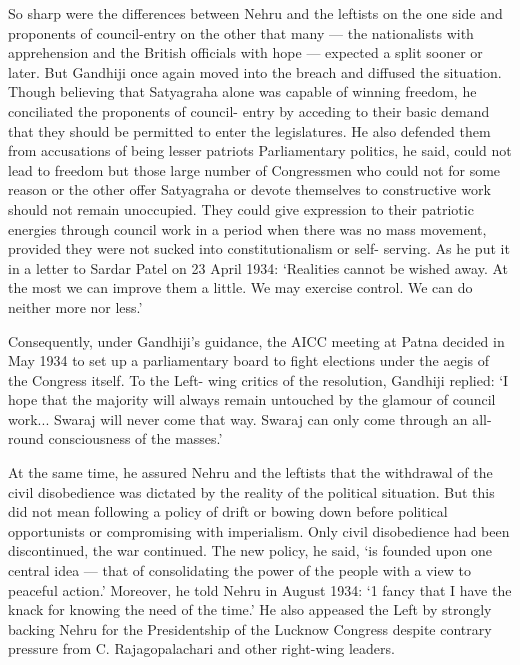 So sharp were the differences between Nehru and the leftists on the one side and proponents of council-entry on the other that many — the nationalists with apprehension and the British officials with hope — expected a split sooner or later. But Gandhiji once again moved into the breach and diffused the situation. Though believing that Satyagraha alone was capable of winning freedom, he conciliated the proponents of council- entry by acceding to their basic demand that they should be permitted to enter the legislatures. He also defended them from accusations of being lesser patriots Parliamentary politics, he said, could not lead to freedom but those large number of Congressmen who could not for some reason or the other offer Satyagraha or devote themselves to constructive work should not remain unoccupied. They could give expression to their patriotic energies through council work in a period when there was no mass movement, provided they were not sucked into constitutionalism or self- serving. As he put it in a letter to Sardar Patel on 23 April 1934: `Realities cannot be wished away. At the most we can improve them a little. We may exercise control. We can do neither more nor less.' 

Consequently, under Gandhiji's guidance, the AICC meeting at Patna decided in May 1934 to set up a parliamentary board to fight elections under the aegis of the Congress itself. To the Left- wing critics of the resolution, Gandhiji replied: `I hope that the majority will always remain untouched by the glamour of council work... Swaraj will never come that way. Swaraj can only come through an all-round consciousness of the masses.' 

At the same time, he assured Nehru and the leftists that the withdrawal of the civil disobedience was dictated by the reality of the political situation. But this did not mean following a policy of drift or bowing down before political opportunists or compromising with imperialism. Only civil disobedience had been discontinued, the war continued. The new policy, he said, `is founded upon one central idea — that of consolidating the power of the people with a view to peaceful action.' Moreover, he told Nehru in August 1934: `1 fancy that I have the knack for knowing the need of the time.' He also appeased the Left by strongly backing Nehru for the Presidentship of the Lucknow Congress despite contrary pressure from C. Rajagopalachari and other right-wing leaders. 

